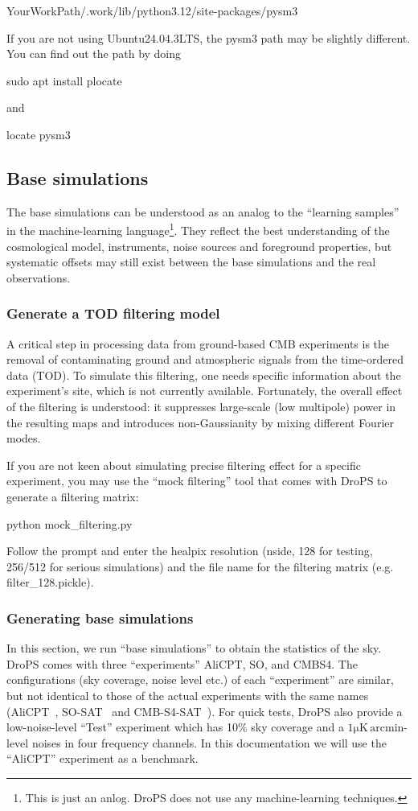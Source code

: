 \documentclass[12pt, a4paper]{ctexart} %
\def\tbox#1{\begin{tcolorbox}#1\end{tcolorbox}}
\begin{document}
YourWorkPath/.work/lib/python3.12/site-packages/pysm3

If you are not using Ubuntu24.04.3LTS, the pysm3 path may be slightly different. You can find out the path by doing
\tbox{sudo apt install plocate}
and
\tbox{locate pysm3}


\subsection{Base simulations}

The base simulations can be understood as an analog to the ``learning samples'' in the machine-learning language\footnote{This is just an anlog. DroPS does not use any machine-learning techniques.}. They reflect the best understanding of the cosmological model, instruments, noise sources and foreground properties, but systematic offsets may still exist between the base simulations and the real observations.

\subsubsection{Generate a TOD filtering model}

A critical step in processing data from ground-based CMB experiments is the removal of contaminating ground and atmospheric signals from the time-ordered data (TOD). To simulate this filtering, one needs specific information about the experiment's site, which is not currently available. Fortunately, the overall effect of the filtering is understood: it suppresses large-scale (low multipole) power in the resulting maps and introduces non-Gaussianity by mixing different Fourier modes.

If you are not keen about simulating precise filtering effect for a specific experiment, you may use the ``mock filtering'' tool that comes with DroPS to generate a filtering matrix:
\tbox{python mock\_filtering.py}

Follow the prompt and enter the healpix resolution (nside, 128 for testing, 256/512 for serious simulations) and the file name for the filtering matrix (e.g. filter\_128.pickle).


\subsubsection{Generating base simulations}

In this section, we run ``base simulations'' to obtain the statistics of the sky.  DroPS comes with three ``experiments'' AliCPT, SO, and CMBS4. The configurations (sky coverage, noise level etc.) of each ``experiment'' are similar, but not identical to those of the actual experiments with the same names (AliCPT~\cite{AliCPT}, SO-SAT~\cite{SO-SAT} and CMB-S4-SAT~\cite{CMB-S4-SAT}). For quick tests, DroPS also provide a low-noise-level ``Test'' experiment which has 10\% sky coverage and a $1 \mathrm{\mu K\, arcmin}$-level noises in four frequency channels. In this documentation we will use the ``AliCPT'' experiment as a benchmark.
\end{document}
